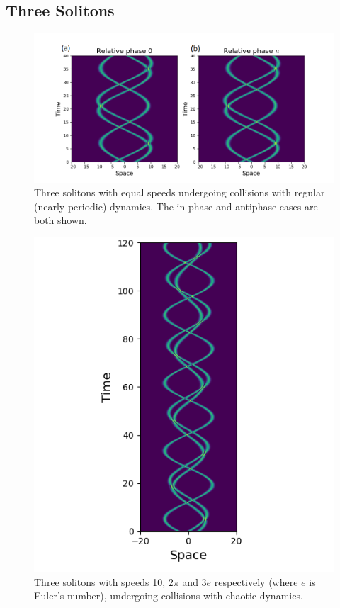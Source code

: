 \documentclass[10pt, twocolumn]{revtex4}    %
\begin{document}
\subsection{Three Solitons}

\begin{figure}[h]
\includegraphics[width=\columnwidth]{3solitons-reg.png}
\caption{Three solitons with equal speeds undergoing collisions with regular (nearly periodic) dynamics. The in-phase and antiphase cases are both shown.}
\end{figure}

\begin{figure}[h]
\includegraphics[width=\columnwidth]{chaotic.png}
\caption{Three solitons with speeds 10, $2\pi$ and $3e$ respectively (where $e$ is Euler's number), undergoing collisions with chaotic dynamics.}
\end{figure}
\end{document}
